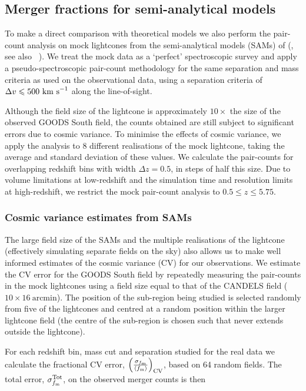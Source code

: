 \subsection{Merger fractions for semi-analytical models}
To make a direct comparison with theoretical models we also perform the pair-count analysis on mock lightcones from the semi-analytical models (SAMs) of \citeauthor{Lu:2011hj} (\citeyear{Lu:2011hj}, see also \citeauthor{Lu:2014kl}~\citeyear{Lu:2014kl}). We treat the mock data as a `perfect' spectroscopic survey and apply a pseudo-spectroscopic pair-count methodology for the same separation and mass criteria as used on the observational data, using a separation criteria of $\Delta v \leq 500~\rm{km~s}^{-1}$ along the line-of-sight.

Although the field size of the lightcone is approximately $10\times$ the size of the observed GOODS South field, the counts obtained are still subject to significant errors due to cosmic variance. To minimise the effects of cosmic variance, we apply the analysis to 8 different realisations of the mock lightcone, taking the average and standard deviation of these values. We calculate the pair-counts for overlapping redshift bins with width $\Delta z = 0.5$, in steps of half this size. Due to volume limitations at low-redshift and the simulation time and resolution limits at high-redshift, we restrict the mock pair-count analysis to $0.5 \leq z \leq 5.75$.

\subsubsection{Cosmic variance estimates from SAMs}\label{merger-sec:CV_SAM}
The large field size of the SAMs and the multiple realisations of the lightcone (effectively simulating separate fields on the sky) also allows us to make well informed estimates of the cosmic variance (CV) for our observations. We estimate the CV error for the GOODS South field by repeatedly measuring the pair-counts in the mock lightcones using a field size equal to that of the CANDELS field ($10 \times 16 ~ \text{arcmin}$). The position of the sub-region being studied is selected randomly from five of the lightcones and centred at a random position within the larger lightcone field (the centre of the sub-region is chosen such that never extends outside the lightcone). 

For each redshift bin, mass cut and separation studied for the real data we calculate the fractional CV error, $\left (\frac{\sigma_{f_{\rm{m}}} }{ \left \langle f_{\text{m}}  \right \rangle}  \right )_{\text{CV}}$, based on 64 random fields. The total error, $\sigma_{f_{\rm{m}}}^{\text{Tot}} $, on the observed merger counts is then

